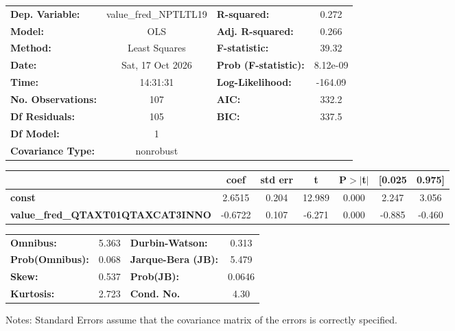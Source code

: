 \begin{center}
\begin{tabular}{lclc}
\toprule
\textbf{Dep. Variable:}                   & value\_fred\_NPTLTL19 & \textbf{  R-squared:         } &     0.272   \\
\textbf{Model:}                           &          OLS          & \textbf{  Adj. R-squared:    } &     0.266   \\
\textbf{Method:}                          &     Least Squares     & \textbf{  F-statistic:       } &     39.32   \\
\textbf{Date:}                            &    Sat, 17 Oct 2026   & \textbf{  Prob (F-statistic):} &  8.12e-09   \\
\textbf{Time:}                            &        14:31:31       & \textbf{  Log-Likelihood:    } &   -164.09   \\
\textbf{No. Observations:}                &            107        & \textbf{  AIC:               } &     332.2   \\
\textbf{Df Residuals:}                    &            105        & \textbf{  BIC:               } &     337.5   \\
\textbf{Df Model:}                        &              1        & \textbf{                     } &             \\
\textbf{Covariance Type:}                 &       nonrobust       & \textbf{                     } &             \\
\bottomrule
\end{tabular}
\begin{tabular}{lcccccc}
                                          & \textbf{coef} & \textbf{std err} & \textbf{t} & \textbf{P$> |$t$|$} & \textbf{[0.025} & \textbf{0.975]}  \\
\midrule
\textbf{const}                            &       2.6515  &        0.204     &    12.989  &         0.000        &        2.247    &        3.056     \\
\textbf{value\_fred\_QTAXT01QTAXCAT3INNO} &      -0.6722  &        0.107     &    -6.271  &         0.000        &       -0.885    &       -0.460     \\
\bottomrule
\end{tabular}
\begin{tabular}{lclc}
\textbf{Omnibus:}       &  5.363 & \textbf{  Durbin-Watson:     } &    0.313  \\
\textbf{Prob(Omnibus):} &  0.068 & \textbf{  Jarque-Bera (JB):  } &    5.479  \\
\textbf{Skew:}          &  0.537 & \textbf{  Prob(JB):          } &   0.0646  \\
\textbf{Kurtosis:}      &  2.723 & \textbf{  Cond. No.          } &     4.30  \\
\bottomrule
\end{tabular}
\end{center}

Notes: \newline
 [1] Standard Errors assume that the covariance matrix of the errors is correctly specified.